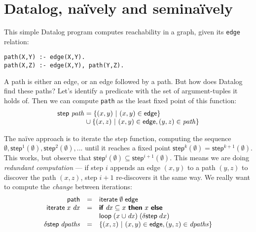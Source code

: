 \documentclass[sigplan,screen,review,timestamp,dvipsnames]{acmart}
\newcommand{\todo}[1]{{\color{ACMPurple}#1}}
\newcommand{\naive}{na\"ive}
\newcommand{\setfor}[2]{\{#1 ~|~ #2\}}
\newcommand{\kw}[1]{\textsf{\bfseries #1}}
\newcommand{\tlv}[1]{\textsf{#1}}
\newcommand{\var}[1]{\mathit{#1}}
\newcommand{\dee}[1]{\var{d#1}}
\newcommand{\eif}[2]{\kw{if}~#1~\kw{then}~#2~\kw{else}~}
\begin{document}



\section{Datalog, \naive{}ly and semi\naive{}ly}\label{sec:datalog}

This simple Datalog program computes reachability in a graph, given its
\texttt{edge} relation:
%
\begin{lstlisting}
path(X,Y) :- edge(X,Y).
path(X,Z) :- edge(X,Y), path(Y,Z).
\end{lstlisting}

A path is either an edge, or an edge followed by a path. But how does Datalog
find these paths? Let's identify a predicate with the set of argument-tuples it
holds of. Then we can compute \texttt{path} as the least fixed point of this
function:
%
\[
\begin{array}{l}
  \tlv{step}~ \var{path} = \setfor{(x,y)}{(x,y) \in \tlv{edge}}\\
  \phantom{\tlv{step}~ \var{path}} \hspace{.5pt}\cup
  \setfor{(x,z)}{(x,y) \in \tlv{edge}, (y,z) \in \var{path}}
\end{array}
\]

The \naive{} approach is to iterate the \tlv{step} function, computing the
sequence $\emptyset, \tlv{step}^1(\emptyset), \tlv{step}^2(\emptyset), ...$
until it reaches a fixed point $\tlv{step}^k(\emptyset) =
\tlv{step}^{k+1}(\emptyset)$.
%
This works, but observe that $\tlv{step}^i(\emptyset) \subseteq
\tlv{step}^{i+1}(\emptyset)$. This means we are doing \emph{redundant
  computation} --- if step $i$ appends an edge $(x,y)$ to a path $(y,z)$ to
discover the path $(x,z)$, step $i+1$ re-discovers it the same way. We really
want to compute the \emph{change} between iterations:
%
\[
\begin{array}{rcl}
  \tlv{path} &=& \tlv{iterate} \;\emptyset \;\tlv{edge}\\
  \tlv{iterate} \;x \;\dee x &=&
  \eif{\dee x \subseteq x}{x}\\
  && \tlv{loop} \;(x \cup \dee x) \;(\delta\tlv{step} \;dx)\\
  \delta\tlv{step} \;\var{dpaths} &=&
  \setfor{(x,z)}{(x,y) \in \tlv{edge}, (y,z) \in \var{dpaths}}\\
\end{array}
\]
\end{document}
